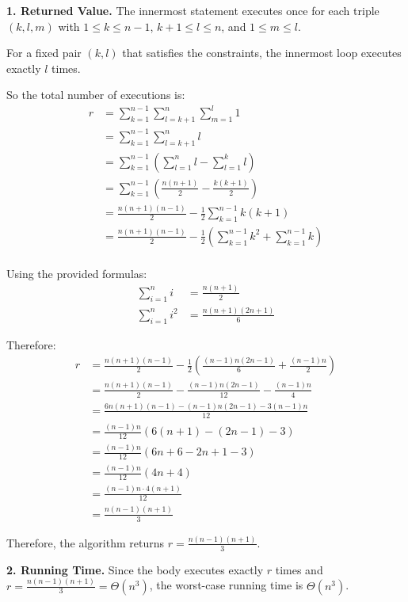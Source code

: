 \documentclass{article}
\theoremstyle{theorem}
\theoremstyle{definition}
\theoremstyle{remark}
\begin{document}
\noindent\textbf{1. Returned Value.}
The innermost statement executes once for each triple $(k,l,m)$ with $1\le k\le n-1$, $k+1\le l\le n$, and $1\le m\le l$.  

For a fixed pair $(k,l)$ that satisfies the constraints, the innermost loop executes exactly $l$ times.

So the total number of executions is:
\begin{align*}
r &= \sum_{k=1}^{n-1}\sum_{l=k+1}^{n}\sum_{m=1}^{l} 1 \\
&= \sum_{k=1}^{n-1}\sum_{l=k+1}^{n} l \\
&= \sum_{k=1}^{n-1} \left( \sum_{l=1}^{n} l - \sum_{l=1}^{k} l \right) \\
&= \sum_{k=1}^{n-1} \left( \frac{n(n+1)}{2} - \frac{k(k+1)}{2} \right) \\
&= \frac{n(n+1)(n-1)}{2} - \frac{1}{2}\sum_{k=1}^{n-1} k(k+1) \\
&= \frac{n(n+1)(n-1)}{2} - \frac{1}{2}\left(\sum_{k=1}^{n-1} k^2 + \sum_{k=1}^{n-1} k\right) \\
\end{align*}

Using the provided formulas:
\begin{align*}
\sum_{i=1}^{n} i &= \frac{n(n+1)}{2} \\
\sum_{i=1}^{n} i^2 &= \frac{n(n+1)(2n+1)}{6}
\end{align*}

Therefore:
\begin{align*}
r &= \frac{n(n+1)(n-1)}{2} - \frac{1}{2}\left(\frac{(n-1)n(2n-1)}{6} + \frac{(n-1)n}{2}\right) \\
&= \frac{n(n+1)(n-1)}{2} - \frac{(n-1)n(2n-1)}{12} - \frac{(n-1)n}{4} \\
&= \frac{6n(n+1)(n-1) - (n-1)n(2n-1) - 3(n-1)n}{12} \\
&= \frac{(n-1)n}{12}(6(n+1) - (2n-1) - 3) \\
&= \frac{(n-1)n}{12}(6n + 6 - 2n + 1 - 3) \\
&= \frac{(n-1)n}{12}(4n + 4) \\
&= \frac{(n-1)n \cdot 4(n+1)}{12} \\
&= \frac{n(n-1)(n+1)}{3}
\end{align*}

Therefore, the algorithm returns $r = \frac{n(n-1)(n+1)}{3}$.

\noindent\textbf{2. Running Time.}
Since the body executes exactly $r$ times and $r = \frac{n(n-1)(n+1)}{3} = \Theta(n^3)$, the worst-case running time is $\Theta(n^3)$.
\end{document}
